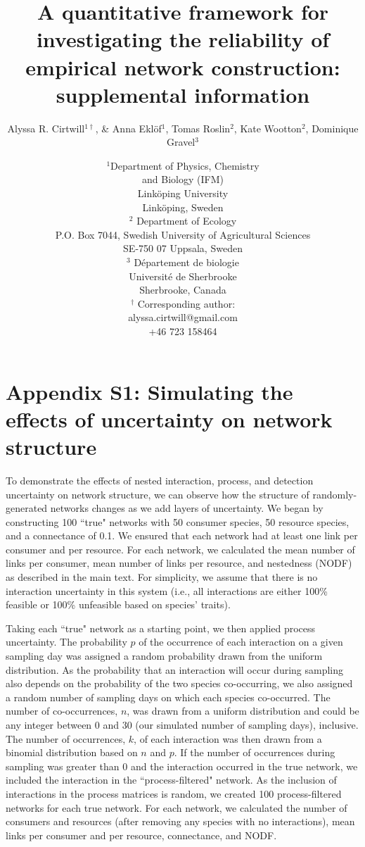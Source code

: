 \documentclass[12pt]{article}
\title{A quantitative framework for investigating the reliability of empirical network construction: supplemental information}
\author{Alyssa R. Cirtwill$^{1\dagger}$, \&  Anna Ekl\"{o}f$^{1}$, Tomas Roslin$^{2}$, Kate Wootton$^{2}$, Dominique Gravel$^{3}$}
\date{\small$^1$Department of Physics, Chemistry\\ 
and Biology (IFM)\\ 
Link\"{o}ping University\\
Link\"{o}ping, Sweden\\
\medskip $^2$ Department of Ecology\\ P.O. Box 7044, Swedish University of Agricultural Sciences \\ SE-750 07 Uppsala, Sweden \\
\medskip$^3$ D\'{e}partement de biologie\\ 
Universit\'{e} de Sherbrooke\\ 
Sherbrooke, Canada\\ 
\medskip
$^\dagger$ Corresponding author:\\
alyssa.cirtwill@gmail.com\\
+46 723 158464\\
}
\begin{document}
 
\maketitle 
\raggedright
\setlength{\parindent}{15pt} 
\clearpage

\linenumbers

\section*{Appendix S1: Simulating the effects of uncertainty on network structure}

  To demonstrate the effects of nested interaction, process, and detection uncertainty on network structure, we can observe how the structure of randomly-generated networks changes as we add layers of uncertainty. We began by constructing 100 ``true" networks with 50 consumer species, 50 resource species, and a connectance of 0.1. We ensured that each network had at least one link per consumer and per resource. For each network, we calculated the mean number of links per consumer, mean number of links per resource, and nestedness (NODF) as described in the main text. For simplicity, we assume that there is no interaction uncertainty in this system (i.e., all interactions are either 100\% feasible or 100\% unfeasible based on species' traits).


  Taking each ``true" network as a starting point, we then applied process uncertainty. The probability $p$ of the occurrence of each interaction on a given sampling day was assigned a random probability drawn from the uniform distribution. As the probability that an interaction will occur during sampling also depends on the probability of the two species co-occurring, we also assigned a random number of sampling days on which each species co-occurred. The number of co-occurrences, $n$, was drawn from a uniform distribution and could be any integer between 0 and 30 (our simulated number of sampling days), inclusive. The number of occurrences, $k$, of each interaction was then drawn from a binomial distribution based on $n$ and $p$. If the number of occurrences during sampling was greater than 0 and the interaction occurred in the true network, we included the interaction in the ``process-filtered" network. As the inclusion of interactions in the process matrices is random, we created 100 process-filtered networks for each true network. For each network, we calculated the number of consumers and resources (after removing any species with no interactions), mean links per consumer and per resource, connectance, and NODF.
\end{document}
